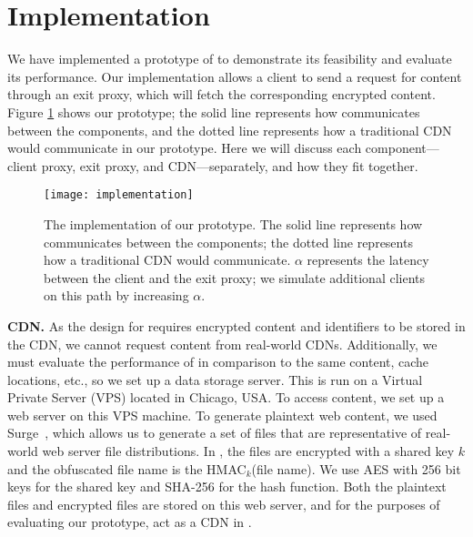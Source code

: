 \section{Implementation}
\label{sec:implementation}

We have implemented a prototype of \system{} to demonstrate its feasibility and 
evaluate its performance.  Our implementation allows a client to send a request 
for content through an exit proxy, which will fetch the corresponding 
encrypted content.  Figure \ref{fig:impl} shows our prototype; the solid line represents
how \system{} communicates between the components, and the dotted line represents how 
a traditional CDN would communicate in our prototype.  Here we will discuss each component---client proxy, exit proxy, 
and CDN---separately, and how they fit together.

\begin{figure}[t]
\centering
\texttt{[image: implementation]}
\caption{The implementation of our \system{} prototype.  The solid line represents
how \system{} communicates between the components; the dotted line represents how 
a traditional CDN would communicate. $\alpha$ represents the latency between the client 
and the exit proxy; we simulate additional clients on this path by increasing $\alpha$.}
\label{fig:impl}
\end{figure}

{\bf CDN.} As the design for \system{} requires encrypted content and identifiers 
to be stored in the CDN, we cannot request content from real-world CDNs.  Additionally, 
we must evaluate the performance of \system{} in comparison to the same content, cache locations, etc., so 
we set up a data storage server.  This is run on a Virtual Private Server (VPS) located in 
Chicago, USA.  To access content, we set up a web server on this VPS machine.  To generate 
plaintext web content, we used Surge~\cite{barford1998generating}, which allows us 
to generate a set of files that are representative of real-world web server file distributions.  
In \system{}, the files are encrypted with a shared key $k$ and the obfuscated file name is the 
HMAC$_{k}$(file name).  We use AES with 256 bit keys for the shared key and SHA-256 for the 
hash function.  Both the plaintext files and encrypted files are stored on this web server, and 
for the purposes of evaluating our prototype, act as a CDN in \system{}.

